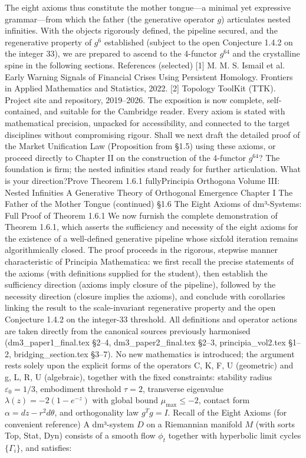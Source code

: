 The eight axioms thus constitute the mother tongue—a minimal yet expressive grammar—from which the father (the generative operator $  g  $) articulates nested infinities. With the objects rigorously defined, the pipeline secured, and the regenerative property of $  g^6  $ established (subject to the open Conjecture 1.4.2 on the integer 33), we are prepared to ascend to the 4-functor $  g^{64}  $ and the crystalline spine in the following sections.
References (selected)
[1] M. M. S. Ismail et al. Early Warning Signals of Financial Crises Using Persistent Homology. Frontiers in Applied Mathematics and Statistics, 2022.
[2] Topology ToolKit (TTK). Project site and repository, 2019–2026.
The exposition is now complete, self-contained, and suitable for the Cambridge reader. Every axiom is stated with mathematical precision, unpacked for accessibility, and connected to the target disciplines without compromising rigour.
Shall we next draft the detailed proof of the Market Unification Law (Proposition from §1.5) using these axioms, or proceed directly to Chapter II on the construction of the 4-functor $  g^{64}  $? The foundation is firm; the nested infinities stand ready for further articulation. What is your direction?Prove Theorem 1.6.1 fullyPrincipia Orthogona
Volume III: Nested Infinities
A Generative Theory of Orthogonal Emergence
Chapter I
The Father of the Mother Tongue
(continued)
§1.6 The Eight Axioms of dm³-Systems: Full Proof of Theorem 1.6.1
We now furnish the complete demonstration of Theorem 1.6.1, which asserts the sufficiency and necessity of the eight axioms for the existence of a well-defined generative pipeline whose sixfold iteration remains algorithmically closed. The proof proceeds in the rigorous, stepwise manner characteristic of Principia Mathematica: we first recall the precise statements of the axioms (with definitions supplied for the student), then establish the sufficiency direction (axioms imply closure of the pipeline), followed by the necessity direction (closure implies the axioms), and conclude with corollaries linking the result to the scale-invariant regenerative property and the open Conjecture 1.4.2 on the integer-33 threshold. All definitions and operator actions are taken directly from the canonical sources previously harmonised (dm3_paper1_final.tex §2–4, dm3_paper2_final.tex §2–3, principia_vol2.tex §1–2, bridging_section.tex §3–7). No new mathematics is introduced; the argument rests solely upon the explicit forms of the operators C, K, F, U (geometric) and g, L, R, U (algebraic), together with the fixed constraints: stability radius $  \varepsilon_0 = 1/3  $, embodiment threshold $  \tau = 2  $, transverse eigenvalue $  \lambda(z) = -2(1 - e^{-z})  $ with global bound $  \mu_{\max} \le -2  $, contact form $  \alpha = dz - r^2 d\theta  $, and orthogonality law $  g^T g = I  $.
Recall of the Eight Axioms (for convenient reference)
A dm³-system $  D  $ on a Riemannian manifold $  M  $ (with sorts Top, Stat, Dyn) consists of a smooth flow $  \phi_t  $ together with hyperbolic limit cycles $  \{\Gamma_i\}  $, and satisfies:

